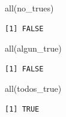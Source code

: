\documentclass[
  ignorenonframetext,
  aspectratio=169,
  spanish,
]{beamer}
\newenvironment{Shaded}{\begin{snugshade}}{\end{snugshade}}
\newcommand{\FunctionTok}[1]{\textcolor[rgb]{0.28,0.35,0.67}{#1}}
\newcommand{\NormalTok}[1]{\textcolor[rgb]{0.00,0.23,0.31}{#1}}
\begin{document}
\begin{frame}[fragile]{}
\label{section-11}
\begin{Shaded}
\begin{Highlighting}[]
\FunctionTok{all}\NormalTok{(no\_trues) }
\end{Highlighting}
\end{Shaded}

\begin{verbatim}
[1] FALSE
\end{verbatim}

\begin{Shaded}
\begin{Highlighting}[]
\FunctionTok{all}\NormalTok{(algun\_true)}
\end{Highlighting}
\end{Shaded}

\begin{verbatim}
[1] FALSE
\end{verbatim}

\begin{Shaded}
\begin{Highlighting}[]
\FunctionTok{all}\NormalTok{(todos\_true)  }
\end{Highlighting}
\end{Shaded}

\begin{verbatim}
[1] TRUE
\end{verbatim}
\end{frame}
\end{document}
